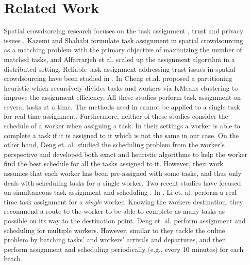 \section{Related Work}
\label{sec:related}

Spatial crowdsorcing research focuses on the task assignment \cite{Kazemi12,Alfarrarjeh15,Cheng15,Deng13,Li15}, trust \cite{Kazemi13,Cheng15} and privacy issues \cite{To14}. Kazemi and Shahabi \cite{Kazemi12} formulate task assignment in spatial crowdsourcing as a matching problem with the primary objective of maximizing the number of matched tasks, and Alfarrarjeh et al. \cite{Alfarrarjeh15} scaled up the assignment algorithm in a distributed setting. Reliable task assignment addressing trust issues in spatial crowdsourcing have been studied in \cite{Kazemi13,Cheng15}. In \cite{Cheng15} Cheng et.al. proposed a partitioning heuristic which recursively divides tasks and workers via KMeans clustering to improve the assignment efficiency. All these studies perform task assignment on several tasks at a time. The methods used in \cite{Kazemi12,Cheng15,Alfarrarjeh15} cannot be applied to a single task for real-time assignment. Furthermore, neither of these studies consider the schedule of a worker when assigning a task. In their settings a worker is able to complete a task if it is assigned to it which is not the same in our case. On the other hand, Deng et. al. \cite{Deng13} studied the scheduling problem from the worker's perspective and developed both exact and heuristic algorithms to help the worker find the best schedule for all the tasks assigned to it. However, their work assumes that each worker has been pre-assigned with some
tasks, and thus only deals with scheduling tasks for a single worker. Two recent studies have focused on simultaneous task assignment and scheduling \cite{Li15,Deng15}. In \cite{Li15}, Li et. al. perform a real-time task assignment for a \emph{single} worker. Knowing the workers destination, they recommend a route to the worker to be able to complete as many tasks as possible on its way to the destination point. Deng et. al. \cite{Deng15} perform assignment and scheduling for multiple workers. However, similar to \cite{Kazemi12,Cheng15,Alfarrarjeh15} they tackle the online problem by batching tasks' and workers' arrivals and departures, and then perform assignment and scheduling periodically (e.g., every 10 minutes) for each batch.

